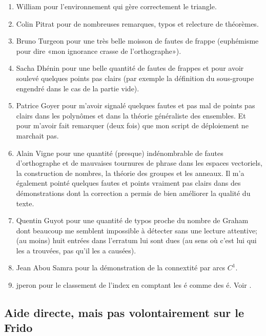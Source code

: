 \begin{enumerate}
	\item
	      William pour l'environnement  qui gère correctement le triangle.
	\item
	      Colin Pitrat pour de nombreuses remarques, typos et relecture de théorèmes.
	\item
	      Bruno Turgeon pour une très belle moisson de fautes de frappe (euphémisme pour dire «mon ignorance crasse de l'orthographe»).
	\item
	      Sacha Dhénin pour une belle quantité de fautes de frappes et pour avoir soulevé quelques points pas clairs (par exemple la définition du sous-groupe engendré dans le cas de la partie vide).
	\item
	      Patrice Goyer pour m'avoir signalé quelques fautes et pas mal de points pas clairs dans les polynômes et dans la théorie généraliste des ensembles. Et pour m'avoir fait remarquer (deux fois) que mon script de déploiement ne marchait pas.
	\item
	      Alain Vigne pour une quantité (presque) indénombrable de fautes d'orthographe et de mauvaises tournures de phrase dans les espaces vectoriels, la construction de nombres, la théorie des groupes et les anneaux. Il m'a également pointé quelques fautes et points vraiment pas clairs dans des démonstrations dont la correction a permis de bien améliorer la qualité du texte.
	\item
	      Quentin Guyot pour une quantité de typos proche du nombre de Graham dont beaucoup me semblent impossible à détecter sans une lecture attentive; (au moins) huit entrées dans l'erratum lui sont dues (au sens où c'est lui qui les a trouvées, pas qu'il les a causées).
	\item
	      Jean Abou Samra pour la démonstration de la connextité par arcs \( C^1\).
	\item
	      jperon pour le classement de l'index en comptant les é comme des é. Voir \cite{BIBooHVJLooVHqAss}.
\end{enumerate}

\subsection{Aide directe, mais pas volontairement sur le Frido}

